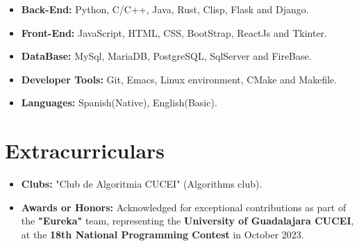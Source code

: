 \documentclass[11pt]{article}
\begin{document}
\begin{itemize}[noitemsep, nolistsep]
\item \textbf{Back-End:} Python, C/C++, Java, Rust, Clisp, Flask and Django.
\item \textbf{Front-End:} JavaScript, HTML, CSS, BootStrap, ReactJs and Tkinter.
\item \textbf{DataBase:} MySql, MariaDB, PostgreSQL, SqlServer and FireBase.
\item \textbf{Developer Tools:} Git, Emacs, Linux environment, CMake and Makefile.
\item \textbf{Languages:} Spanish(Native), English(Basic).
\end{itemize}
\vspace{-0.5cm}

\section*{Extracurriculars}
\vspace{-0.3cm}
\titlerule[0.3pt]
\vspace{0.1cm}
\begin{itemize}[noitemsep, nolistsep]
\item \textbf{Clubs:} "Club de Algoritmia CUCEI" (Algorithms club).
\item \textbf{Awards or Honors:} Acknowledged for exceptional contributions as part of the \textbf{"Eureka"}
  team, representing the \textbf{University of Guadalajara CUCEI}, at the
  \textbf{18th National Programming Contest} in October 2023.
\end{itemize}
\end{document}
